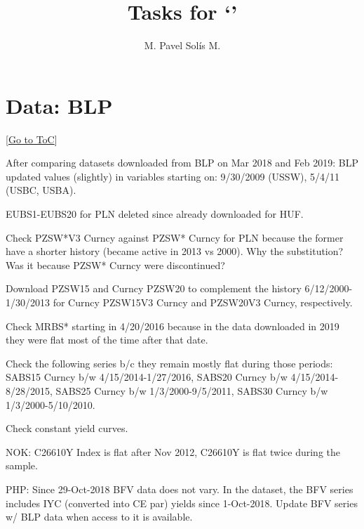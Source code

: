 \documentclass[12pt]{article}
\newcommand{\gototoc}{\vspace{-1.8cm} \null\hfill [\hyperlink{toc}{Go to ToC}] \newline}
\begin{document}
	\title{Tasks for `'}
	\author{M. Pavel Solís M.}
	\date{}
	\maketitle
	\hypertarget{toc}{}								 %
	\tableofcontents
	\vspace{2.5\bigskipamount}
	

\section{Data: BLP}
\gototoc
\begin{todolist}
	\item After comparing datasets downloaded from BLP on Mar 2018 and Feb 2019: BLP updated values (slightly) in variables starting on: 9/30/2009 (USSW), 5/4/11 (USBC, USBA).
	\item EUBS1-EUBS20 for PLN deleted since already downloaded for HUF.
	\item Check PZSW*V3 Curncy against PZSW* Curncy for PLN because the former have a shorter history (became active in 2013 vs 2000). Why the substitution? Was it because PZSW* Curncy were discontinued?
	\item Download PZSW15 and Curncy PZSW20 to complement the history 6/12/2000-1/30/2013 for Curncy PZSW15V3 Curncy and PZSW20V3 Curncy, respectively.
	\item Check MRBS* starting in 4/20/2016 because in the data downloaded in 2019 they were flat most of the time after that date.
	\item Check the following series b/c they remain mostly flat during those periods: SABS15 Curncy b/w 4/15/2014-1/27/2016, SABS20 Curncy b/w 4/15/2014-8/28/2015, SABS25 Curncy b/w 1/3/2000-9/5/2011, SABS30 Curncy b/w 1/3/2000-5/10/2010.
	\item Check constant yield curves.
	\begin{todolist}
		\item NOK: C26610Y Index is flat after Nov 2012, C26610Y is flat twice during the sample.
		\item PHP: Since 29-Oct-2018 BFV data does not vary. In the dataset, the BFV series includes IYC (converted into CE par) yields since 1-Oct-2018. Update BFV series w/ BLP data when access to it is available.
	\end{todolist}
\end{todolist}
\end{document}
